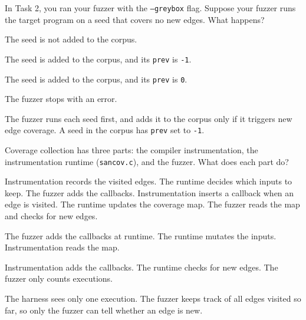 \documentclass[addpoints]{exam}
\newcommand{\Code}[1]{\texttt{#1}}
\begin{document}
\begin{questions}
  \vspace{12pt}
\question[1] In Task 2, you ran your fuzzer with the \Code{--greybox}
  flag. Suppose your fuzzer runs the target program on a seed that
  covers no new edges. What happens?
  \begin{choices}
  \CorrectChoice The seed is not added to the corpus.
  \item The seed is added to the corpus, and its \Code{prev} is
    \Code{-1}.
  \item The seed is added to the corpus, and its \Code{prev} is
    \Code{0}.
  \item The fuzzer stops with an error.
  \end{choices}
  \begin{solution}
    The fuzzer runs each seed first, and adds it to the corpus only if
    it triggers new edge coverage. A seed in the corpus has
    \Code{prev} set to \Code{-1}.
  \end{solution}

\newpage

\question[1] Coverage collection has three parts: the compiler
  instrumentation, the instrumentation runtime (\Code{sancov.c}), and
  the fuzzer. What does each part do?
  \begin{choices}
  \item Instrumentation records the visited edges. The runtime decides
    which inputs to keep. The fuzzer adds the callbacks.
    \CorrectChoice Instrumentation inserts a callback when an edge is
    visited. The runtime updates the coverage map. The fuzzer reads
    the map and checks for new edges.
  \item The fuzzer adds the callbacks at runtime. The runtime mutates
    the inputs. Instrumentation reads the map.
  \item Instrumentation adds the callbacks. The runtime checks for new
    edges. The fuzzer only counts executions.
  \end{choices}
  \begin{solution}
    The harness sees only one execution. The fuzzer keeps track of all
    edges visited so far, so only the fuzzer can tell whether an edge
    is new.
  \end{solution}


\end{questions}
\end{document}
